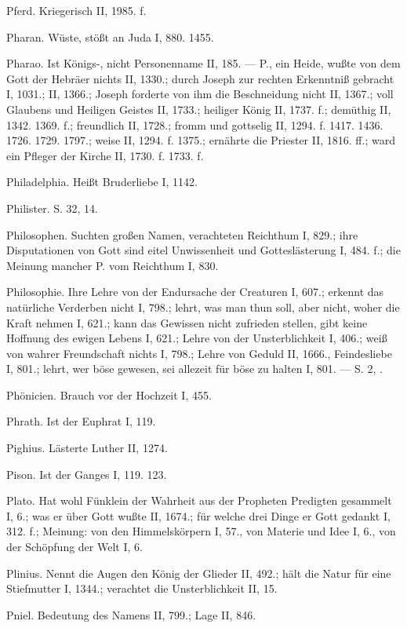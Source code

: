 Pferd. Kriegerisch II, 1985. f.

Pharan. Wüste, stößt an Juda I, 880. 1455.

Pharao. Ist Königs-, nicht Personenname II, 185. — P.,  ein Heide, wußte von dem Gott der Hebräer nichts II, 1330.; durch Joseph zur rechten Erkenntniß gebracht I, 1031.; II, 1366.; Joseph forderte von ihm die Beschneidung nicht II, 1367.; voll Glaubens und Heiligen Geistes II, 1733.; heiliger König II, 1737. f.; demüthig II, 1342. 1369. f.; freundlich II, 1728.; fromm und gottselig II, 1294. f. 1417. 1436. 1726. 1729. 1797.; weise II, 1294. f. 1375.; ernährte die Priester II, 1816. ff.; ward ein Pfleger der Kirche II, 1730. f. 1733. f.

Philadelphia. Heißt Bruderliebe I, 1142.

Philister. S.  32,  14.

Philosophen. Suchten großen Namen, verachteten Reichthum I, 829.; ihre Disputationen von Gott sind eitel Unwissenheit und Gotteslästerung I, 484. f.; die Meinung mancher P. vom Reichthum I, 830.

Philosophie. Ihre Lehre von der Endursache der Creaturen I, 607.; erkennt das natürliche Verderben nicht I, 798.; lehrt, was man thun soll, aber nicht, woher die Kraft nehmen I, 621.; kann das Gewissen nicht zufrieden stellen, gibt keine Hoffnung des ewigen Lebens I, 621.; Lehre von der Unsterblichkeit I, 406.; weiß von wahrer Freundschaft nichts I, 798.; Lehre von Geduld II, 1666., Feindesliebe I, 801.; lehrt, wer böse gewesen, sei allezeit für böse zu halten I, 801. — S.  2, .

Phönicien. Brauch vor der Hochzeit I, 455.

Phrath. Ist der Euphrat I, 119.

Pighius. Lästerte Luther II, 1274.

Pison. Ist der Ganges I, 119. 123.

Plato. Hat wohl Fünklein der Wahrheit aus der Propheten Predigten gesammelt I, 6.; was er über Gott wußte II, 1674.; für welche drei Dinge er Gott gedankt I, 312. f.; Meinung: von den Himmelskörpern I, 57., von Materie und Idee I, 6., von der Schöpfung der Welt I, 6.

Plinius. Nennt die Augen den König der Glieder II, 492.; hält die Natur für eine Stiefmutter I, 1344.; verachtet die Unsterblichkeit II, 15.

Pniel. Bedeutung des Namens II, 799.; Lage II, 846.

